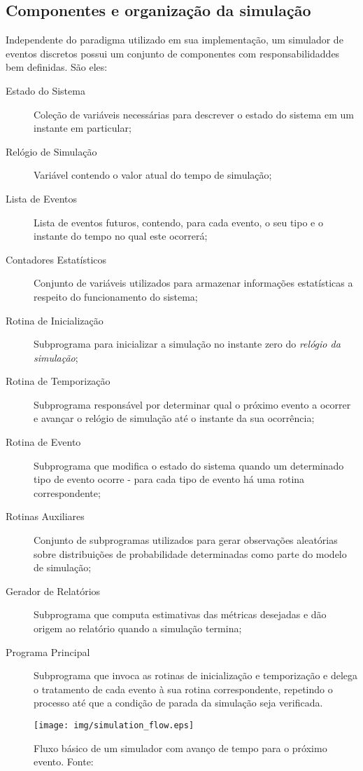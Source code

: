 \subsection{\label{subsec:simulation:components}Componentes e organização da
simulação}

Independente do paradigma utilizado em sua implementação, um simulador de
eventos discretos possui um conjunto de componentes com responsabilidaddes bem
definidas. São eles:

\begin{description}
\item[Estado do Sistema] Coleção de variáveis necessárias para descrever o estado do sistema em um instante em particular;
\item[Relógio de Simulação] Variável contendo o valor atual do tempo de simulação;
\item[Lista de Eventos] Lista de eventos futuros, contendo, para cada evento, o
seu tipo e o instante do tempo no qual este ocorrerá;
\item[Contadores Estatísticos] Conjunto de variáveis utilizados para armazenar informações estatísticas a respeito do funcionamento do sistema;
\item[Rotina de Inicialização] Subprograma para inicializar a simulação no
instante zero do \textit{relógio da simulação};
\item[Rotina de Temporização] Subprograma responsável por determinar qual o
próximo evento a ocorrer e avançar o relógio de simulação até o instante da sua
ocorrência;
\item[Rotina de Evento] Subprograma que modifica o estado do sistema quando um determinado tipo de evento ocorre - para cada tipo de evento há uma rotina
correspondente;
\item[Rotinas Auxiliares] Conjunto de subprogramas utilizados para gerar observações aleatórias sobre distribuições de probabilidade determinadas como parte do modelo de simulação;
\item[Gerador de Relatórios] Subprograma que computa estimativas das métricas desejadas e dão origem ao relatório quando a simulação termina;
\item[Programa Principal] Subprograma que invoca as rotinas de inicialização e temporização e delega o tratamento de cada evento à sua rotina correspondente, repetindo o processo até que a condição de parada da simulação seja verificada.
\end{description}

\begin{figure}[htb!]
\centering\texttt{[image: img/simulation\_flow.eps]}
\caption[Fluxo de execução de um simulador]{\label{fig:simflow}Fluxo básico de um simulador com avanço de tempo para o próximo evento. Fonte:~\cite{Law}}
\end{figure}

